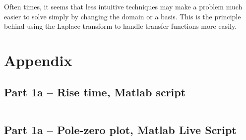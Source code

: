 \documentclass[12pt]{article}
\begin{document}
Often times, it seems that less intuitive techniques may make a problem much easier to solve simply by changing the domain or a basis.
This is the principle behind using the Laplace transform to handle transfer functions more easily.

\newpage
\appendix
\section{Appendix}

\subsection{Part 1a -- Rise time, Matlab script}\label{sap:solving for .9cf and .1cf}
\inputminted{matlab}{src/part01a_rise_time.m}

\subsection{Part 1a -- Pole-zero plot, Matlab Live Script}\label{sap:pzplot}
\inputminted{matlab}{src/part01a_pzplot_mlx.m}
\end{document}
